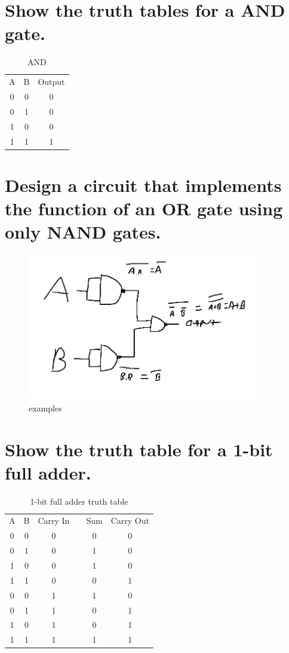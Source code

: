 \documentclass{article}
\begin{document}
\section{Show the truth tables for a AND gate.}
\begin{table}[h]
    \centering
    \begin{tabular}{|c|c|c|}
        A & B & Output \\
        0 & 0 & 0\\
        0 & 1 & 0\\
        1 & 0 & 0\\
        1 & 1 & 1\\
    \end{tabular}
    \caption{AND}
    \label{tab:my_label}
\end{table}

\section{Design a circuit that implements the function of an OR gate using only NAND gates.}
\begin{figure}[h]
    \centering
    \includegraphics[width=100mm]{digitalLogic3.PNG}
    \caption{examples}
    \label{fig:my_label}
\end{figure}
\newpage
\section{Show the truth table for a 1-bit full adder.}
\begin{table}[h]
    \centering
    \begin{tabular}{|c|c|c|c|c|c|}
        A & B & Carry In & & Sum & Carry Out \\
        0 & 0 & 0 & & 0 & 0\\
        0 & 1 & 0 & & 1 & 0\\
        1 & 0 & 0 & & 1 & 0\\
        1 & 1 & 0 & & 0 & 1\\
        0 & 0 & 1 & & 1 & 0\\
        0 & 1 & 1 & & 0 & 1\\
        1 & 0 & 1 & & 0 & 1\\
        1 & 1 & 1 & & 1 & 1
    \end{tabular}
    \caption{1-bit full adder truth table}
    \label{tab:my_label}
\end{table}
\end{document}

